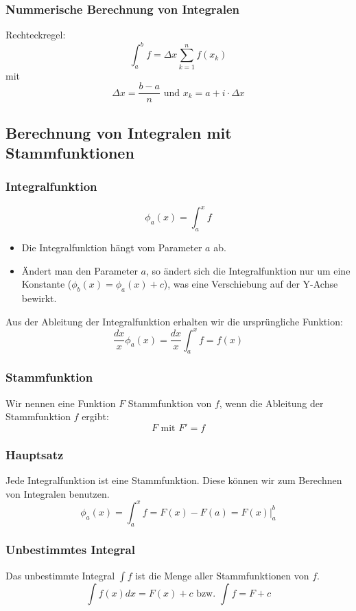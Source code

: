 \subsubsection{Nummerische Berechnung von Integralen}
Rechteckregel:
\[ \int^b_a f =  \Delta x \sum_{k=1}^{n}f(x_k) \]
mit
\[ \Delta x = \frac{b-a}{n} \text{ und } x_k = a + i \cdot \Delta x \]

\subsection{Berechnung von Integralen mit Stammfunktionen}
\subsubsection{Integralfunktion}
\[ \phi_a(x) = \int_a^x f \]
\begin{itemize}
  \item Die Integralfunktion hängt vom Parameter $a$ ab.
  \item Ändert man den Parameter $a$, so ändert sich die
  Integralfunktion nur um eine Konstante ($\phi_b(x) = \phi_a(x) + c$),
  was eine Verschiebung auf der Y-Achse bewirkt.
\end{itemize}

Aus der Ableitung der Integralfunktion erhalten wir die ursprüngliche Funktion:
\[ \frac{dx}{x} \phi_a(x) = \frac{dx}{x} \int_a^x f = f(x) \]

\subsubsection{Stammfunktion}
Wir nennen eine Funktion $F$ Stammfunktion von $f$, wenn die Ableitung
der Stammfunktion $f$ ergibt:
\[F \text{ mit } F' = f\]
\subsubsection{Hauptsatz}
Jede Integralfunktion ist eine Stammfunktion. Diese können wir zum
Berechnen von Integralen benutzen.
\[\phi_a(x) = \int_a^x f  = F(x) - F(a) = F(x)|^b_a\]

\subsubsection{Unbestimmtes Integral}
Das unbestimmte Integral $\int f$ ist die Menge aller Stammfunktionen
von $f$.
\[ \int f(x) dx = F(x) + c \text{ bzw. } \int f = F + c\]

